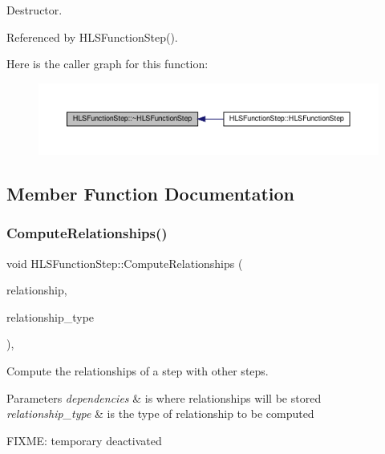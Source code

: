 Destructor. 



Referenced by H\+L\+S\+Function\+Step().

Here is the caller graph for this function\+:
\nopagebreak
\begin{figure}[H]
\begin{center}
\leavevmode
\includegraphics[width=350pt]{d9/d41/classHLSFunctionStep_a7dd044b202977e978dd096a53ede7d61_icgraph}
\end{center}
\end{figure}


\subsection{Member Function Documentation}
\mbox{\label{classHLSFunctionStep_ab3864e8dbd73b0eabc25f386a0cece54}} 
\subsubsection{\texorpdfstring{Compute\+Relationships()}{ComputeRelationships()}}
{\footnotesize\ttfamily void H\+L\+S\+Function\+Step\+::\+Compute\+Relationships (\begin{DoxyParamCaption}\item[{\hyperlink{classDesignFlowStepSet}{Design\+Flow\+Step\+Set} \&}]{relationship,  }\item[{const \hyperlink{classDesignFlowStep_a723a3baf19ff2ceb77bc13e099d0b1b7}{Design\+Flow\+Step\+::\+Relationship\+Type}}]{relationship\+\_\+type }\end{DoxyParamCaption})\hspace{0.3cm}{\ttfamily [override]}, {\ttfamily [virtual]}}



Compute the relationships of a step with other steps. 


\begin{DoxyParams}{Parameters}
{\em dependencies} & is where relationships will be stored \\
\hline
{\em relationship\+\_\+type} & is the type of relationship to be computed \\
\hline
\end{DoxyParams}
F\+I\+X\+ME\+: temporary deactivated

